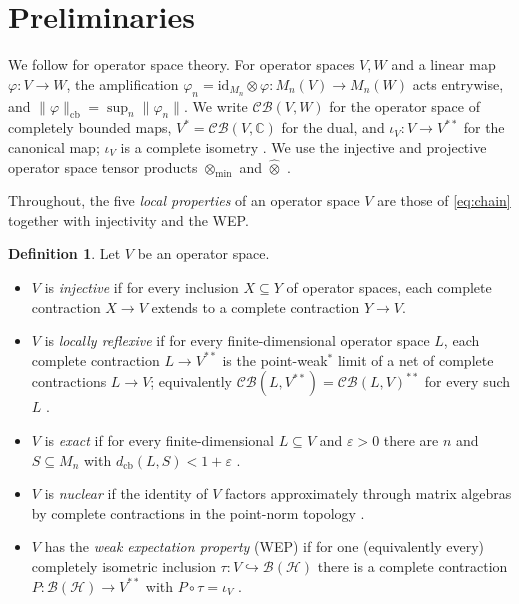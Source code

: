 \documentclass[12pt]{article}
\theoremstyle{definition}
\newtheorem{definition}[theorem]{Definition}
\theoremstyle{remark}
\newcommand{\cb}{\mathrm{cb}}
\newcommand{\CB}{\mathcal{CB}}
\newcommand{\B}{\mathcal{B}}
\newcommand{\Hil}{\mathcal{H}}
\newcommand{\Mn}{M_n}
\newcommand{\otmin}{\otimes_{\min}}
\newcommand{\ri}{\rightarrow}
\begin{document}
\section{Preliminaries}

We follow \cite{ER00,Pi03} for operator space theory. For operator spaces
$V,W$ and a linear map $\varphi:V\ri W$, the amplification
$\varphi_n=\mathrm{id}_{\Mn}\otimes\varphi:\Mn(V)\ri\Mn(W)$ acts entrywise,
and $\|\varphi\|_\cb=\sup_n\|\varphi_n\|$. We write $\CB(V,W)$ for the
operator space of completely bounded maps, $V^*=\CB(V,\mathbb C)$ for the
dual, and $\iota_V:V\ri V^{**}$ for the canonical map; $\iota_V$ is a complete
isometry \cite[\S 3.2]{ER00}. We use the injective and projective operator
space tensor products $\otmin$ and $\widehat\otimes$ \cite{Ble92}.

Throughout, the five \emph{local properties} of an operator space $V$ are
those of \eqref{eq:chain} together with injectivity and the WEP.

\begin{definition}\label{def:props}
Let $V$ be an operator space.
\begin{itemize}
\item[(i)] $V$ is \emph{injective} if for every inclusion $X\subseteq Y$ of
operator spaces, each complete contraction $X\ri V$ extends to a complete
contraction $Y\ri V$.
\item[(ii)] $V$ is \emph{locally reflexive} if for every finite-dimensional
operator space $L$, each complete contraction $L\ri V^{**}$ is the
point-weak$^*$ limit of a net of complete contractions $L\ri V$;
equivalently $\CB(L,V^{**})=\CB(L,V)^{**}$ for every such $L$
\cite[Thm.~14.3.1]{ER00}.
\item[(iii)] $V$ is \emph{exact} if for every finite-dimensional $L\subseteq
V$ and $\varepsilon>0$ there are $n$ and $S\subseteq\Mn$ with
$d_\cb(L,S)<1+\varepsilon$ \cite{Pi92,Pi03}.
\item[(iv)] $V$ is \emph{nuclear} if the identity of $V$ factors approximately
through matrix algebras by complete contractions in the point-norm topology
\cite{EOR}.
\item[(v)] $V$ has the \emph{weak expectation property} (WEP) if for one
(equivalently every) completely isometric inclusion $\tau:V\hookrightarrow
\B(\Hil)$ there is a complete contraction $P:\B(\Hil)\ri V^{**}$ with
$P\circ\tau=\iota_V$ \cite[\S 15]{ER00}.
\end{itemize}
\end{definition}
\end{document}
